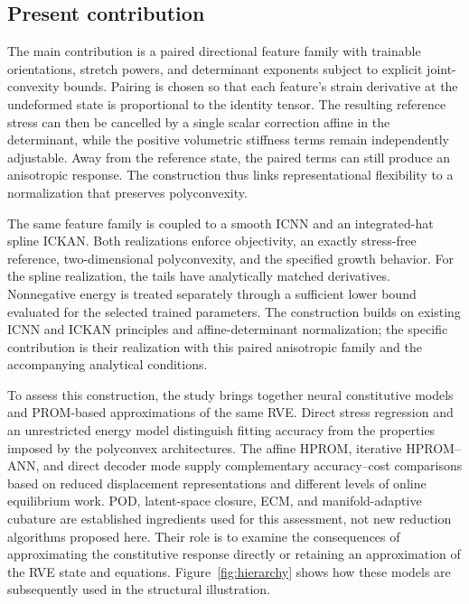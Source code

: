 

\subsection{Present contribution}
The main contribution is a paired directional feature family with trainable orientations, stretch powers, and determinant exponents subject to explicit joint-convexity bounds. Pairing is chosen so that each feature's strain derivative at the undeformed state is proportional to the identity tensor. The resulting reference stress can then be cancelled by a single scalar correction affine in the determinant, while the positive volumetric stiffness terms remain independently adjustable. Away from the reference state, the paired terms can still produce an anisotropic response. The construction thus links representational flexibility to a normalization that preserves polyconvexity.

The same feature family is coupled to a smooth ICNN and an integrated-hat spline ICKAN. Both realizations enforce objectivity, an exactly stress-free reference, two-dimensional polyconvexity, and the specified growth behavior. For the spline realization, the tails have analytically matched derivatives. Nonnegative energy is treated separately through a sufficient lower bound evaluated for the selected trained parameters. The construction builds on existing ICNN and ICKAN principles and affine-determinant normalization; the specific contribution is their realization with this paired anisotropic family and the accompanying analytical conditions.

To assess this construction, the study brings together neural constitutive models and PROM-based approximations of the same RVE. Direct stress regression and an unrestricted energy model distinguish fitting accuracy from the properties imposed by the polyconvex architectures. The affine HPROM, iterative HPROM--ANN, and direct decoder mode supply complementary accuracy--cost comparisons based on reduced displacement representations and different levels of online equilibrium work. POD, latent-space closure, ECM, and manifold-adaptive cubature are established ingredients used for this assessment, not new reduction algorithms proposed here. Their role is to examine the consequences of approximating the constitutive response directly or retaining an approximation of the RVE state and equations. Figure~\ref{fig:hierarchy} shows how these models are subsequently used in the structural illustration.

